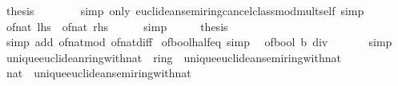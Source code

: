 \begin{isabellebody}
\ {\isacharquery}{\kern0pt}thesis\isanewline
\ \ \ \ \ \ \isamarkupfalse%
\ {\isacharparenleft}{\kern0pt}simp\ only{\isacharcolon}{\kern0pt}\ euclidean{\isacharunderscore}{\kern0pt}semiring{\isacharunderscore}{\kern0pt}cancel{\isacharunderscore}{\kern0pt}class{\isachardot}{\kern0pt}mod{\isacharunderscore}{\kern0pt}mult{\isacharunderscore}{\kern0pt}self{}{\isacharparenright}{\kern0pt}\ simp\isanewline
\ \ \isamarkupfalse%
\isanewline
\ \ \isamarkupfalse%
\ \isamarkupfalse%
\ {\isacartoucheopen}of{\isacharunderscore}{\kern0pt}nat\ {\isacharquery}{\kern0pt}lhs\ {\isacharequal}{\kern0pt}\ of{\isacharunderscore}{\kern0pt}nat\ {\isacharquery}{\kern0pt}rhs{\isacartoucheclose}\isanewline
\ \ \ \ \isamarkupfalse%
\ simp\isanewline
\ \ \isamarkupfalse%
\ \isamarkupfalse%
\ {\isacharquery}{\kern0pt}thesis\isanewline
\ \ \ \ \isamarkupfalse%
\ {\isacharparenleft}{\kern0pt}simp\ add{\isacharcolon}{\kern0pt}\ of{\isacharunderscore}{\kern0pt}nat{\isacharunderscore}{\kern0pt}mod\ of{\isacharunderscore}{\kern0pt}nat{\isacharunderscore}{\kern0pt}diff{\isacharparenright}{\kern0pt}\isanewline
{}\isamarkupfalse%
%
\endisatagproof
{\isafoldproof}%
%
\isadelimproof
\isanewline
%
\endisadelimproof
\isanewline
{}\isamarkupfalse%
\ of{\isacharunderscore}{\kern0pt}bool{\isacharunderscore}{\kern0pt}half{\isacharunderscore}{\kern0pt}eq{\isacharunderscore}{\kern0pt}{}\ {\isacharbrackleft}{\kern0pt}simp{\isacharbrackright}{\kern0pt}{\isacharcolon}{\kern0pt}\isanewline
\ \ {\isacartoucheopen}of{\isacharunderscore}{\kern0pt}bool\ b\ div\ {}\ {\isacharequal}{\kern0pt}\ {}{\isacartoucheclose}\isanewline
%
\isadelimproof
\ \ %
\endisadelimproof
%
\isatagproof
{}\isamarkupfalse%
\ simp%
\endisatagproof
{\isafoldproof}%
%
\isadelimproof
\isanewline
%
\endisadelimproof
\isanewline
{}\isamarkupfalse%
\isanewline
\isanewline
{}\isamarkupfalse%
\ unique{\isacharunderscore}{\kern0pt}euclidean{\isacharunderscore}{\kern0pt}ring{\isacharunderscore}{\kern0pt}with{\isacharunderscore}{\kern0pt}nat\ {\isacharequal}{\kern0pt}\ ring\ {\isacharplus}{\kern0pt}\ unique{\isacharunderscore}{\kern0pt}euclidean{\isacharunderscore}{\kern0pt}semiring{\isacharunderscore}{\kern0pt}with{\isacharunderscore}{\kern0pt}nat\isanewline
\isanewline
{}\isamarkupfalse%
\ nat\ {\isacharcolon}{\kern0pt}{\isacharcolon}{\kern0pt}\ unique{\isacharunderscore}{\kern0pt}euclidean{\isacharunderscore}{\kern0pt}semiring{\isacharunderscore}{\kern0pt}with{\isacharunderscore}{\kern0pt}nat\isanewline

\end{isabellebody}
